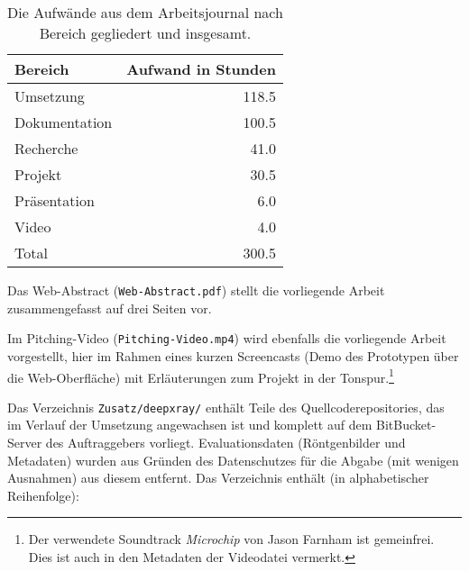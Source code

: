 \begin{table}[H]
    \center
    \begin{tabular}{l|r}
        Bereich & Aufwand in Stunden \\ \hline
        Umsetzung & 118.5 \\
        Dokumentation & 100.5 \\
        Recherche & 41.0 \\
        Projekt & 30.5 \\
        Präsentation & 6.0 \\
        Video & 4.0 \\ \hline
        Total & 300.5 \\ \hline \hline
    \end{tabular}
    \caption{Die Aufwände aus dem Arbeitsjournal nach Bereich gegliedert und insgesamt.}
    \label{tbl:arbeitsjournal}
\end{table}

Das Web-Abstract (\texttt{Web-Abstract.pdf}) stellt die vorliegende Arbeit zusammengefasst auf drei Seiten vor.

Im Pitching-Video (\texttt{Pitching-Video.mp4}) wird ebenfalls die vorliegende Arbeit vorgestellt, hier im Rahmen eines kurzen Screencasts (Demo des Prototypen über die Web-Oberfläche) mit Erläuterungen zum Projekt in der Tonspur.\footnote{Der verwendete Soundtrack \textit{Microchip} von Jason Farnham ist gemeinfrei. Dies ist auch in den Metadaten der Videodatei vermerkt.}

Das Verzeichnis \texttt{Zusatz/deepxray/} enthält Teile des Quellcoderepositories, das im Verlauf der Umsetzung angewachsen ist und komplett auf dem BitBucket-Server des Auftraggebers vorliegt. Evaluationsdaten (Röntgenbilder und Metadaten) wurden aus Gründen des Datenschutzes für die Abgabe (mit wenigen Ausnahmen) aus diesem entfernt. Das Verzeichnis enthält (in alphabetischer Reihenfolge):

